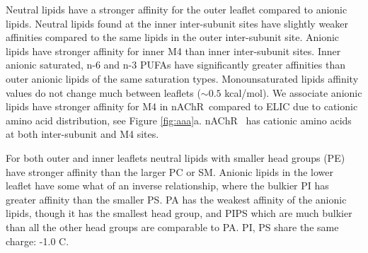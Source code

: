 \documentclass[preprint,3p,9pt,times,onecolumn]{elsarticle}
\newcommand{\notsure}[1]{\textcolor{red}{#1}}
\newcommand{\nachr}{nAChR}
\begin{document}

Neutral lipids have a stronger affinity for the outer leaflet compared to anionic lipids. Neutral lipids found at the inner inter-subunit sites have slightly weaker affinities compared to the same lipids in the outer inter-subunit site. Anionic lipids have stronger affinity for inner M4 than inner inter-subunit sites. Inner anionic saturated, n-6 and n-3 PUFAs have significantly greater affinities than outer anionic lipids of the same saturation types. Monounsaturated lipids affinity values do not change much between leaflets ($\sim 0.5$ kcal/mol). We associate anionic lipids have stronger affinity for M4 in \nachr~compared to ELIC due to cationic amino acid distribution, see Figure \ref{fig:aaa}a. \nachr~ has cationic amino acids at both inter-subunit and M4 sites.

For both outer and inner leaflets neutral lipids with smaller head groups (PE) have stronger affinity than the larger PC or SM. Anionic lipids in the lower leaflet have some what of an inverse relationship, where the bulkier PI has greater affinity than the smaller PS.  PA has the weakest affinity of the anionic lipids, though it has the smallest head group, and PIPS which are much bulkier than all the other head groups are comparable to PA. PI, PS  share the same charge: -1.0 C. %

%
\end{document}
